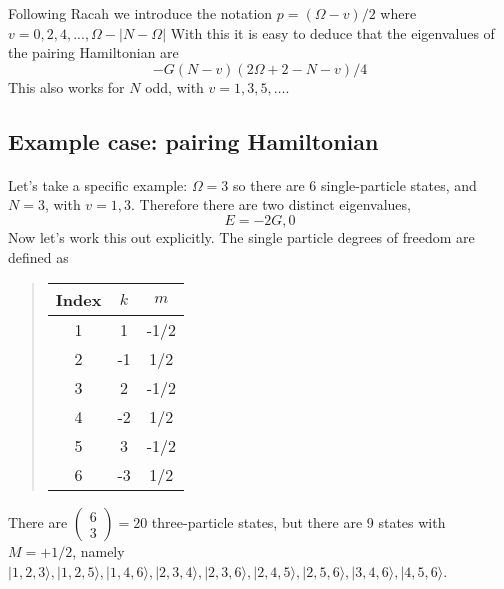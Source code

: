 \documentclass[%
twoside,                 %
final,                   %
10pt]{article}
\begin{document}
Following Racah we introduce the notation
$p = (\Omega - v)/2$
where $v = 0, 2, 4,..., \Omega - |N-\Omega|$ 
With this it is easy to deduce that the eigenvalues of the pairing Hamiltonian are
\[
-G(N-v)(2\Omega +2-N-v)/4
\]
This also works for $N$ odd, with $v= 1,3,5, \dots$.




\subsection{Example case: pairing Hamiltonian}

\paragraph{}

Let's take a specific example: $\Omega = 3$ so there are 6 single-particle states, 
and $N = 3$, with $v= 1,3$. Therefore there are two distinct eigenvalues, 
\[
E = -2G, 0
\]
Now let's work this out explicitly. The single particle degrees of freedom are defined as


\begin{quote}
\begin{tabular}{ccc}
\hline
\multicolumn{1}{c}{ Index } & \multicolumn{1}{c}{ $k$ } & \multicolumn{1}{c}{ $m$ } \\
\hline
1     & 1   & -1/2 \\
2     & -1  & 1/2  \\
3     & 2   & -1/2 \\
4     & -2  & 1/2  \\
5     & 3   & -1/2 \\
6     & -3  & 1/2  \\
\hline
\end{tabular}
\end{quote}

\noindent
 There are  $\left( \begin{array}{c}6 \\ 3 \end{array} \right) = 20$ three-particle states, but there 
are 9 states with $M = +1/2$, namely
$| 1,2,3 \rangle, |1,2,5\rangle, | 1,4,6 \rangle, | 2,3,4 \rangle, |2,3,6 \rangle, | 2,4,5 \rangle, | 2, 5, 6 \rangle, |3,4,6 \rangle, | 4,5,6 \rangle$.
\end{document}
